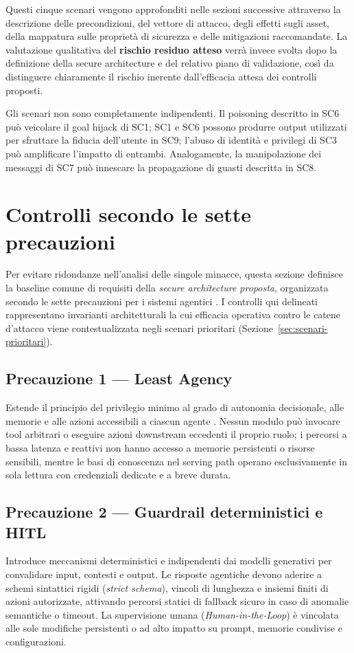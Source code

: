 \documentclass[11pt,a4paper]{article}
\begin{document}
Questi cinque scenari vengono approfonditi nelle sezioni successive
attraverso la descrizione delle precondizioni, del vettore di attacco,
degli effetti sugli asset, della mappatura sulle proprietà di sicurezza
e delle mitigazioni raccomandate. La valutazione qualitativa del
\textbf{rischio residuo atteso} verrà invece svolta dopo la definizione
della secure architecture e del relativo piano di validazione, così da
distinguere chiaramente il rischio inerente dall'efficacia attesa dei
controlli proposti.

Gli scenari non sono completamente indipendenti. Il poisoning descritto
in SC6 può veicolare il goal hijack di SC1; SC1 e SC6 possono produrre
output utilizzati per sfruttare la fiducia dell'utente in SC9; l'abuso
di identità e privilegi di SC3 può amplificare l'impatto di entrambi.
Analogamente, la manipolazione dei messaggi di SC7 può innescare la
propagazione di guasti descritta in SC8.

\section{Controlli secondo le sette precauzioni}
\label{sec:precauzioni}

Per evitare ridondanze nell'analisi delle singole minacce, questa sezione definisce la baseline comune di requisiti della \emph{secure architecture proposta}, organizzata secondo le sette precauzioni per i sistemi agentici \cite{damianiagentic}. I controlli qui delineati rappresentano invarianti architetturali la cui efficacia operativa contro le catene d'attacco viene contestualizzata negli scenari prioritari (Sezione~\ref{sec:scenari-prioritari}).

\subsection{Precauzione 1 --- Least Agency}
Estende il principio del privilegio minimo al grado di autonomia decisionale, alle memorie e alle azioni accessibili a ciascun agente \cite{damianiagentic}. Nessun modulo può invocare tool arbitrari o eseguire azioni downstream eccedenti il proprio ruolo; i percorsi a bassa latenza e reattivi non hanno accesso a memorie persistenti o risorse sensibili, mentre le basi di conoscenza nel serving path operano esclusivamente in sola lettura con credenziali dedicate e a breve durata.

\subsection{Precauzione 2 --- Guardrail deterministici e HITL}
Introduce meccanismi deterministici e indipendenti dai modelli generativi per convalidare input, contesti e output. Le risposte agentiche devono aderire a schemi sintattici rigidi (\emph{strict schema}), vincoli di lunghezza e insiemi finiti di azioni autorizzate, attivando percorsi statici di fallback sicuro in caso di anomalie semantiche o timeout. La supervisione umana (\emph{Human-in-the-Loop}) è vincolata alle sole modifiche persistenti o ad alto impatto su prompt, memorie condivise e configurazioni.
\end{document}
